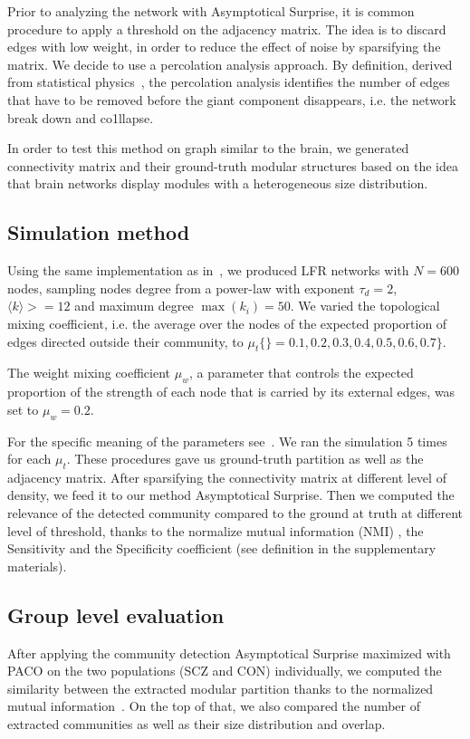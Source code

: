 Prior to analyzing the network with Asymptotical Surprise, it is common procedure to apply a threshold on the adjacency matrix. 
The idea is to discard edges with low weight, in order to reduce the effect of noise by sparsifying the matrix. 
We decide to use a percolation analysis approach. 
By definition, derived from statistical physics~\cite{stauffer1992,alexander-bloch2010,gallos2012,fornito2016}, the percolation analysis identifies the number of edges that have to be removed before the giant component disappears, i.e. the network break down and co1llapse.

In order to test this method on graph similar to the brain, we generated connectivity matrix and their ground-truth modular structures based on the idea that brain networks display modules with a heterogeneous size distribution.

\subsection{Simulation method}
Using the same implementation as in~\cite{lancichinetti2008}, we produced LFR networks with $N = 600$ nodes, sampling nodes degree from a power-law with exponent $\tau_d = 2$, $\langle k \rangle> = 12$ and maximum degree $\max(k_i) = 50$.
We varied the topological mixing coefficient, i.e. the average over the nodes of the expected proportion of edges directed outside their community, to $\mu_t \{\}= 0.1,0.2,0.3,0.4,0.5,0.6,0.7\}$.

The weight mixing coefficient $\mu_w$, a parameter that controls the expected proportion of the strength of each node that is carried by its external edges, was set to $\mu_w=0.2$.

For the specific meaning of the parameters see~\cite{lancichinetti2008,lancichinetti2009a}.
We ran the simulation 5 times for each $\mu_t$.
These procedures gave us ground-truth partition as well as the adjacency matrix. 
After sparsifying the connectivity matrix at different level of density, we feed it to our method Asymptotical Surprise.
Then we computed the relevance of the detected community compared to the ground at truth at different level of threshold, thanks to the normalize mutual information (NMI) , the Sensitivity and the Specificity coefficient (see definition in the supplementary materials).

\subsection{Group level evaluation}
After applying the community detection Asymptotical Surprise maximized with PACO on the two populations (SCZ and CON) individually, we computed the similarity between the extracted modular partition thanks to the normalized mutual information~\cite{danon2005}.
On the top of that, we also compared the number of extracted communities as well as their size distribution and overlap.

